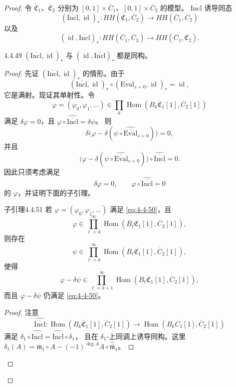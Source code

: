\begin{proof}
令 $\overline{\mathfrak C}_1$、$\overline{\mathfrak C}_2$ 分别为
$[0,1]\times\overline C_1$、$[0,1]\times\overline C_2$ 的模型。
$\overline{\mathrm{Incl}}$ 诱导同态
\[
 (\overline{\mathrm{Incl}},\operatorname{id})_*
 \colon HH(\overline{\mathfrak C}_1,\overline C_2)
 \longrightarrow HH(\overline C_1,\overline C_2)
\]
以及
\[
 (\operatorname{id},\overline{\mathrm{Incl}})_*
 \colon HH(\overline C_1,\overline C_2)
 \longrightarrow HH(\overline C_1,\overline{\mathfrak C}_2).
\]

\begin{lemma}{4.4.49}\label{lem:4-4-49}
$(\overline{\mathrm{Incl}},\operatorname{id})_*$ 与
$(\operatorname{id},\overline{\mathrm{Incl}})_*$ 都是同构。
\end{lemma}

\begin{proof}
先证 $(\overline{\mathrm{Incl}},\operatorname{id})_*$ 的情形。由于
\[
 (\overline{\mathrm{Incl}},\operatorname{id})_*
 \circ(\overline{\mathrm{Eval}}_{s=0},\operatorname{id})_*
 =\operatorname{id},
\]
它是满射。现证其单射性。令
\[
 \varphi=(\varphi_0,\varphi_1,\ldots)
 \in\prod_k\operatorname{Hom}
 (B_k\overline{\mathfrak C}_1[1],\overline C_2[1])
\]
满足 $\delta\varphi=0$，且
$\varphi\circ\widehat{\overline{\mathrm{Incl}}}=\delta\psi$。
则
\[
 \delta\bigl(\varphi-
 \delta(\psi\circ\widehat{\overline{\mathrm{Eval}}}_{s=0})\bigr)=0,
\]
并且
\[
 \bigl(\varphi-
 \delta(\psi\circ\widehat{\overline{\mathrm{Eval}}}_{s=0})\bigr)
 \circ\widehat{\overline{\mathrm{Incl}}}=0.
\]
因此只须考虑满足
\begin{equation}
 \delta\varphi=0,
 \qquad
 \varphi\circ\widehat{\overline{\mathrm{Incl}}}=0
\tag{4.4.50}\label{eq:4-4-50}
\end{equation}
的 $\varphi$，并证明下面的子引理。

\begin{statement}{子引理}{4.4.51}\label{sublem:4-4-51}
若 $\varphi=(\varphi_0,\varphi_1,\ldots)$ 满足
\eqref{eq:4-4-50}，且
\[
 \varphi\in\prod_{\ell=k}^{\infty}
 \operatorname{Hom}(B_\ell\overline{\mathfrak C}_1[1],
 \overline C_2[1]),
\]
则存在
\[
 \psi\in\prod_{\ell=k}^{\infty}
 \operatorname{Hom}(B_\ell\overline{\mathfrak C}_1[1],
 \overline C_2[1]),
\]
使得
\[
 \varphi-\delta\psi\in\prod_{\ell=k+1}^{\infty}
 \operatorname{Hom}(B_\ell\overline{\mathfrak C}_1[1],
 \overline C_2[1]),
\]
而且 $\varphi-\delta\psi$ 仍满足 \eqref{eq:4-4-50}。
\end{statement}

\begin{proof}
注意
\[
 \widehat{\overline{\mathrm{Incl}}}\colon
 \operatorname{Hom}(B_k\overline{\mathfrak C}_1[1],
 \overline C_2[1])
 \longrightarrow
 \operatorname{Hom}(B_k\overline C_1[1],
 \overline C_2[1])
\]
满足
$\delta_1\circ\widehat{\overline{\mathrm{Incl}}}
=\widehat{\overline{\mathrm{Incl}}}\circ\delta_1$，
且在 $\delta_1$-上同调上诱导同构。这里
$\delta_1(A)=\overline{\mathfrak m}_1\circ A
-(-1)^{\deg A}A\circ\widehat{\overline{\mathfrak m}}_1$。


\end{proof}
\end{proof}
\end{proof}
